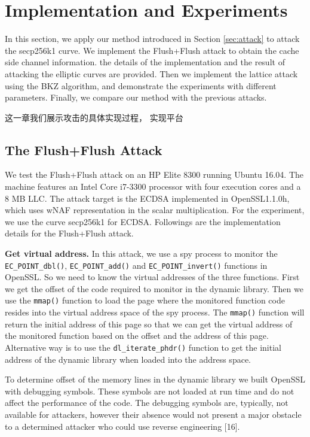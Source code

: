 \section{Implementation and Experiments}
\label{sec:impl&exper}
In this section, we apply our method introduced in Section \ref{sec:attack} to attack the secp256k1 curve.
  We implement the Flush+Flush attack  to obtain
the cache side channel information.
the details of the implementation and the result of attacking the elliptic curves are provided.
Then we implement the lattice attack using the BKZ algorithm,
 and demonstrate the experiments with different parameters.
Finally, we compare our method with the previous attacks.

这一章我们展示攻击的具体实现过程，
实现平台

\subsection{The Flush+Flush Attack}
\label{ffattack}
We test the Flush+Flush attack on an HP Elite 8300 running Ubuntu 16.04.
The machine features an Intel Core i7-3300 processor with four execution cores and a 8 MB LLC.
The attack target is the ECDSA implemented in OpenSSL1.1.0h, which uses wNAF representation in the scalar multiplication.
For the experiment, we use the curve secp256k1 for ECDSA.
Followings are the implementation details for the Flush+Flush attack.


\noindent\textbf{Get virtual address. }
In this attack, we use a spy process to monitor the  \verb+EC_POINT_dbl()+,  \verb+EC_POINT_add()+ and \verb+EC_POINT_invert()+ functions in OpenSSL.
So we need to know the virtual addresses of the three functions.
First we get the offset of the code required to monitor in the dynamic library.
Then we use the \verb+mmap()+ function to load the page where the monitored function code resides into the virtual address space of the spy process.
The \verb+mmap()+ function will return the initial address of this page so that we can get the virtual address of the monitored function based on the offset and the address of this page.
Alternative way is to use the \verb+dl_iterate_phdr()+ function to get the initial address of the dynamic library when loaded into the address space.

To determine offset of the memory lines in the  dynamic library  we built OpenSSL with debugging symbols.
 These symbols are not loaded at run time and do not affect the performance of the code.
The debugging symbols are, typically, not available for attackers,
 however their absence would not present a major obstacle to a determined attacker who could use reverse engineering [16].



